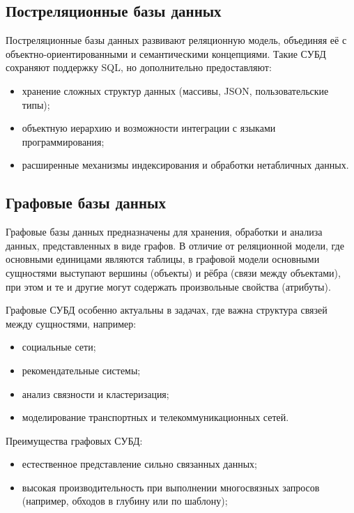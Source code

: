 \subsection{Постреляционные базы данных}

Постреляционные базы данных развивают реляционную модель, объединяя её с объектно-ориентированными и семантическими концепциями. Такие СУБД сохраняют поддержку SQL, но дополнительно предоставляют:

\begin{itemize}
    \item хранение сложных структур данных (массивы, JSON, пользовательские типы);
    \item объектную иерархию и возможности интеграции с языками программирования;
    \item расширенные механизмы индексирования и обработки нетабличных данных.
\end{itemize}

\subsection{Графовые базы данных}

Графовые базы данных предназначены для хранения, обработки и анализа данных, представленных в виде графов. В отличие от реляционной модели, где основными единицами являются таблицы, в графовой модели основными сущностями выступают вершины (объекты) и рёбра (связи между объектами), при этом и те и другие могут содержать произвольные свойства (атрибуты).

Графовые СУБД особенно актуальны в задачах, где важна структура связей между сущностями, например:
\begin{itemize}
    \item социальные сети;
    \item рекомендательные системы;
    \item анализ связности и кластеризация;
    \item моделирование транспортных и телекоммуникационных сетей.
\end{itemize}

Преимущества графовых СУБД:
\begin{itemize}
    \item естественное представление сильно связанных данных;
    \item высокая производительность при выполнении многосвязных запросов (например, обходов в глубину или по шаблону);
\end{itemize}

